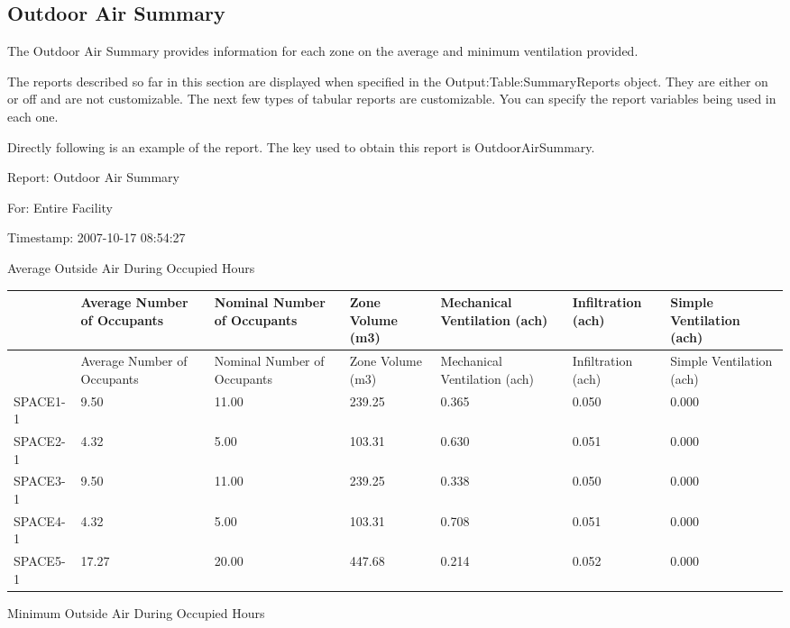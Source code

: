 \subsection{Outdoor Air Summary}\label{outdoor-air-summary}

The Outdoor Air Summary provides information for each zone on the average and minimum ventilation provided.

The reports described so far in this section are displayed when specified in the Output:Table:SummaryReports object. They are either on or off and are not customizable. The next few types of tabular reports are customizable. You can specify the report variables being used in each one.

Directly following is an example of the report. The key used to obtain this report is OutdoorAirSummary.

Report: Outdoor Air Summary

For: Entire Facility

Timestamp: 2007-10-17 08:54:27

Average Outside Air During Occupied Hours

\begin{longtable}[c]{>{\raggedright}p{0.85in}>{\raggedright}p{0.85in}>{\raggedright}p{0.85in}>{\raggedright}p{0.85in}>{\raggedright}p{0.85in}>{\raggedright}p{0.85in}>{\raggedright}p{0.85in}}
\toprule 
~ & Average Number of Occupants & Nominal Number of Occupants & Zone Volume (m3) & Mechanical Ventilation (ach) & Infiltration (ach) & Simple Ventilation (ach) \tabularnewline
\midrule
\endfirsthead

\toprule 
~ & Average Number of Occupants & Nominal Number of Occupants & Zone Volume (m3) & Mechanical Ventilation (ach) & Infiltration (ach) & Simple Ventilation (ach) \tabularnewline
\midrule
\endhead

SPACE1-1 & 9.50 & 11.00 & 239.25 & 0.365 & 0.050 & 0.000 \tabularnewline
SPACE2-1 & 4.32 & 5.00 & 103.31 & 0.630 & 0.051 & 0.000 \tabularnewline
SPACE3-1 & 9.50 & 11.00 & 239.25 & 0.338 & 0.050 & 0.000 \tabularnewline
SPACE4-1 & 4.32 & 5.00 & 103.31 & 0.708 & 0.051 & 0.000 \tabularnewline
SPACE5-1 & 17.27 & 20.00 & 447.68 & 0.214 & 0.052 & 0.000 \tabularnewline
\bottomrule
\end{longtable}

Minimum Outside Air During Occupied Hours

